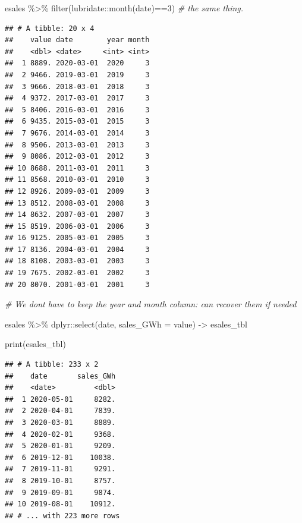 \documentclass[
]{book}
\newenvironment{Shaded}{\begin{snugshade}}{\end{snugshade}}
\newcommand{\AttributeTok}[1]{\textcolor[rgb]{0.77,0.63,0.00}{#1}}
\newcommand{\CommentTok}[1]{\textcolor[rgb]{0.56,0.35,0.01}{\textit{#1}}}
\newcommand{\DecValTok}[1]{\textcolor[rgb]{0.00,0.00,0.81}{#1}}
\newcommand{\FunctionTok}[1]{\textcolor[rgb]{0.00,0.00,0.00}{#1}}
\newcommand{\NormalTok}[1]{#1}
\newcommand{\OtherTok}[1]{\textcolor[rgb]{0.56,0.35,0.01}{#1}}
\newcommand{\SpecialCharTok}[1]{\textcolor[rgb]{0.00,0.00,0.00}{#1}}
\begin{document}
\begin{Shaded}
\begin{Highlighting}[]
\NormalTok{esales }\SpecialCharTok{\%\textgreater{}\%} \FunctionTok{filter}\NormalTok{(lubridate}\SpecialCharTok{::}\FunctionTok{month}\NormalTok{(date)}\SpecialCharTok{==}\DecValTok{3}\NormalTok{)  }\CommentTok{\#   the same thing.}
\end{Highlighting}
\end{Shaded}

\begin{verbatim}
## # A tibble: 20 x 4
##    value date        year month
##    <dbl> <date>     <int> <int>
##  1 8889. 2020-03-01  2020     3
##  2 9466. 2019-03-01  2019     3
##  3 9666. 2018-03-01  2018     3
##  4 9372. 2017-03-01  2017     3
##  5 8406. 2016-03-01  2016     3
##  6 9435. 2015-03-01  2015     3
##  7 9676. 2014-03-01  2014     3
##  8 9506. 2013-03-01  2013     3
##  9 8086. 2012-03-01  2012     3
## 10 8688. 2011-03-01  2011     3
## 11 8568. 2010-03-01  2010     3
## 12 8926. 2009-03-01  2009     3
## 13 8512. 2008-03-01  2008     3
## 14 8632. 2007-03-01  2007     3
## 15 8519. 2006-03-01  2006     3
## 16 9125. 2005-03-01  2005     3
## 17 8136. 2004-03-01  2004     3
## 18 8108. 2003-03-01  2003     3
## 19 7675. 2002-03-01  2002     3
## 20 8070. 2001-03-01  2001     3
\end{verbatim}

\begin{Shaded}
\begin{Highlighting}[]
\CommentTok{\# We don\textquotesingle{}t have to keep the \textquotesingle{}year\textquotesingle{} and \textquotesingle{}month\textquotesingle{} column: can recover them if needed}

\NormalTok{esales }\SpecialCharTok{\%\textgreater{}\%}
\NormalTok{  dplyr}\SpecialCharTok{::}\FunctionTok{select}\NormalTok{(date, }\AttributeTok{sales\_GWh =}\NormalTok{ value) }\OtherTok{{-}\textgreater{}}\NormalTok{ esales\_tbl}

\FunctionTok{print}\NormalTok{(esales\_tbl)}
\end{Highlighting}
\end{Shaded}

\begin{verbatim}
## # A tibble: 233 x 2
##    date       sales_GWh
##    <date>         <dbl>
##  1 2020-05-01     8282.
##  2 2020-04-01     7839.
##  3 2020-03-01     8889.
##  4 2020-02-01     9368.
##  5 2020-01-01     9209.
##  6 2019-12-01    10038.
##  7 2019-11-01     9291.
##  8 2019-10-01     8757.
##  9 2019-09-01     9874.
## 10 2019-08-01    10912.
## # ... with 223 more rows
\end{verbatim}
\end{document}
